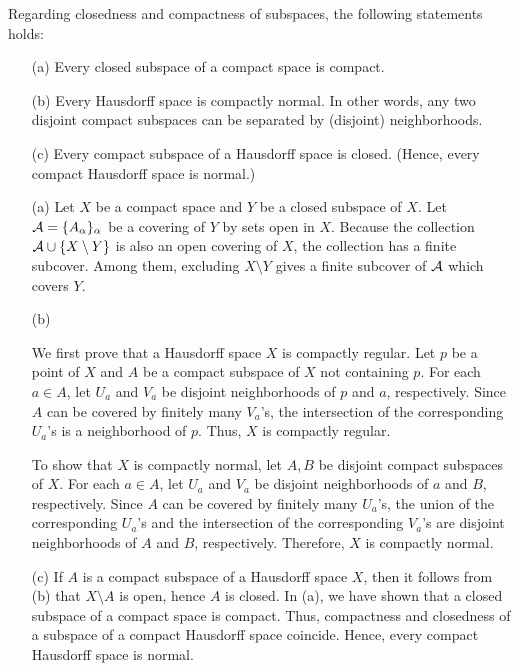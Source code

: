 \begin{thm}
    Regarding closedness and compactness of subspaces, the following statements holds:
    \begin{enumerate}
        \item[(a)]
        {
            Every closed subspace of a compact space is compact.
        }
        \item[(b)]
        {
            Every Hausdorff space is compactly normal.
            In other words, any two disjoint compact subspaces can be separated by (disjoint) neighborhoods.
        }
        \item[(c)]
        {
            Every compact subspace of a Hausdorff space is closed. (Hence, every compact Hausdorff space is normal.)
        }
    \end{enumerate}
\end{thm}
\begin{sol}
    \begin{enumerate}
        \item[(a)]
        {
            Let $X$ be a compact space and $Y$ be a closed subspace of $X$.
            Let ${\mathcal{A}}=\{A_\alpha\}_\alpha$ be a covering of $Y$ by sets open in $X$.
            Because the collection ${\mathcal{A}}\cup\{X\setminus Y\}$ is also an open covering of $X$, the collection has a finite subcover.
            Among them, excluding $X\setminus Y$ gives a finite subcover of ${\mathcal{A}}$ which covers $Y$.
        }
        \item[(b)]
        {
            We first prove that a Hausdorff space $X$ is compactly regular.
            Let $p$ be a point of $X$ and $A$ be a compact subspace of $X$ not containing $p$.
            For each $a\in A$, let $U_a$ and $V_a$ be disjoint neighborhoods of $p$ and $a$, respectively.
            Since $A$ can be covered by finitely many $V_a$'s, the intersection of the corresponding $U_a$'s is a neighborhood of $p$.
            Thus, $X$ is compactly regular.

            To show that $X$ is compactly normal, let $A, B$ be disjoint compact subspaces of $X$.
            For each $a\in A$, let $U_a$ and $V_a$ be disjoint neighborhoods of $a$ and $B$, respectively.
            Since $A$ can be covered by finitely many $U_a$'s, the union of the corresponding $U_a$'s and the intersection of the corresponding $V_a$'s are disjoint neighborhoods of $A$ and $B$, respectively.
            Therefore, $X$ is compactly normal.
        }
        \item[(c)]
        {
            If $A$ is a compact subspace of a Hausdorff space $X$, then it follows from (b) that $X\setminus A$ is open, hence $A$ is closed.
            In (a), we have shown that a closed subspace of a compact space is compact.
            Thus, compactness and closedness of a subspace of a compact Hausdorff space coincide.
            Hence, every compact Hausdorff space is normal.
        }
    \end{enumerate}
\end{sol}

